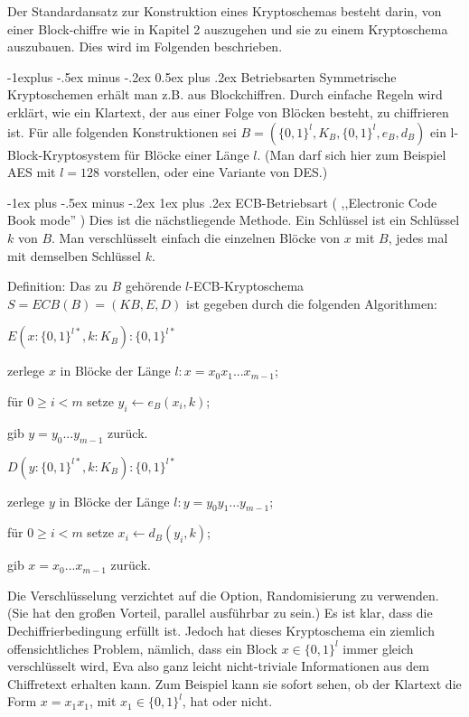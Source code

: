 \documentclass[a4paper]{article}
\makeatletter
\renewcommand{\subsection}{\@startsection{subsection}{2}{0mm}%
 {-1explus -.5ex minus -.2ex}%
 {0.5ex plus .2ex}%
 {\normalfont\normalsize\bfseries}}
\renewcommand{\subsubsection}{\@startsection{subsubsection}{3}{0mm}%
 {-1ex plus -.5ex minus -.2ex}%
 {1ex plus .2ex}%
 {\normalfont\small\bfseries}}
\makeatother
\begin{document}
\begin{multicols}{3}
    Der Standardansatz zur Konstruktion eines Kryptoschemas besteht darin, von einer Block-chiffre wie in Kapitel 2 auszugehen und sie zu einem Kryptoschema auszubauen. Dies wird im Folgenden beschrieben.

    \subsection{Betriebsarten}
    Symmetrische Kryptoschemen erhält man z.B. aus Blockchiffren. Durch einfache Regeln wird erklärt, wie ein Klartext, der aus einer Folge von Blöcken besteht, zu chiffrieren ist. Für alle folgenden Konstruktionen sei $B=(\{0,1\}^l,K_B,\{0,1\}^l,e_B,d_B)$ ein l-Block-Kryptosystem für Blöcke einer Länge $l$. (Man darf sich hier zum Beispiel AES mit $l=128$ vorstellen, oder eine Variante von DES.)

    \subsubsection{ECB-Betriebsart ( ,,Electronic Code Book mode'' )}
    Dies ist die nächstliegende Methode. Ein Schlüssel ist ein Schlüssel $k$ von $B$. Man verschlüsselt einfach die einzelnen Blöcke von $x$ mit $B$, jedes mal mit demselben Schlüssel $k$.

    Definition: Das zu $B$ gehörende $l$-ECB-Kryptoschema $S=ECB(B)=(KB,E,D)$ ist gegeben durch die folgenden Algorithmen:
    \begin{itemize*}
        \item $E(x:\{0,1\}^{l*},k:K_B) :\{0,1\}^{l*}$
        \item zerlege $x$ in Blöcke der Länge $l:x=x_0 x_1 ...x_{m-1}$;
        \item für $0\geq i < m$ setze $y_i\leftarrow e_B(x_i,k)$;
        \item gib $y=y_0 ...y_{m-1}$ zurück.
        \item $D(y:\{0,1\}^{l*},k:K_B) :\{0,1\}^{l*}$
        \item zerlege $y$ in Blöcke der Länge $l:y=y_0 y_1 ...y_{m-1}$;
        \item für $0\geq i < m$ setze $x_i\leftarrow d_B(y_i,k)$;
        \item gib $x=x_0 ...x_{m-1}$ zurück.
    \end{itemize*}

    Die Verschlüsselung verzichtet auf die Option, Randomisierung zu verwenden. (Sie hat den großen Vorteil, parallel ausführbar zu sein.) Es ist klar, dass die Dechiffrierbedingung erfüllt ist. Jedoch hat dieses Kryptoschema ein ziemlich offensichtliches Problem, nämlich,
    dass ein Block $x\in\{0,1\}^l$ immer gleich verschlüsselt wird, Eva also ganz leicht nicht-triviale Informationen aus dem Chiffretext erhalten kann. Zum Beispiel kann sie sofort sehen, ob der Klartext die Form $x=x_1 x_1$, mit $x_1\in\{0,1\}^l$, hat oder nicht.


\end{multicols}
\end{document}
